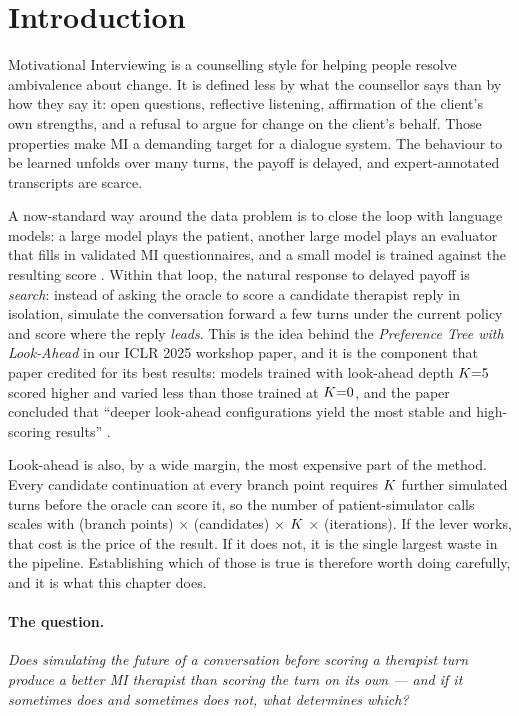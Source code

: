\section{Introduction}
\label{sec:intro}

Motivational Interviewing \citep[MI;][]{miller1991mi} is a counselling style for helping
people resolve ambivalence about change. It is defined less by what the counsellor says
than by how they say it: open questions, reflective listening, affirmation of the client's
own strengths, and a refusal to argue for change on the client's behalf. Those properties
make MI a demanding target for a dialogue system. The behaviour to be learned unfolds over
many turns, the payoff is delayed, and expert-annotated transcripts are scarce.

A now-standard way around the data problem is to close the loop with language models: a
large model plays the patient, another large model plays an evaluator that fills in
validated MI questionnaires, and a small model is trained against the resulting score
\citep{yosef2024assessing, baruch2025pto}. Within that loop, the natural response to
delayed payoff is \emph{search}: instead of asking the oracle to score a candidate
therapist reply in isolation, simulate the conversation forward a few turns under the
current policy and score where the reply \emph{leads}. This is the idea behind the
\emph{Preference Tree with Look-Ahead} in our ICLR 2025 workshop paper, and it is the
component that paper credited for its best results: models trained with look-ahead depth
$K{=}5$ scored higher and varied less than those trained at $K{=}0$, and the paper
concluded that ``deeper look-ahead configurations yield the most stable and high-scoring
results'' \citep{baruch2025pto}.

Look-ahead is also, by a wide margin, the most expensive part of the method. Every
candidate continuation at every branch point requires $K$ further simulated turns before
the oracle can score it, so the number of patient-simulator calls scales with (branch
points) $\times$ (candidates) $\times$ $K$ $\times$ (iterations). If the lever works, that
cost is the price of the result. If it does not, it is the single largest waste in the
pipeline. Establishing which of those is true is therefore worth doing carefully, and it is
what this chapter does.

\paragraph{The question.}
\emph{Does simulating the future of a conversation before scoring a therapist turn produce
a better MI therapist than scoring the turn on its own --- and if it sometimes does and
sometimes does not, what determines which?}

